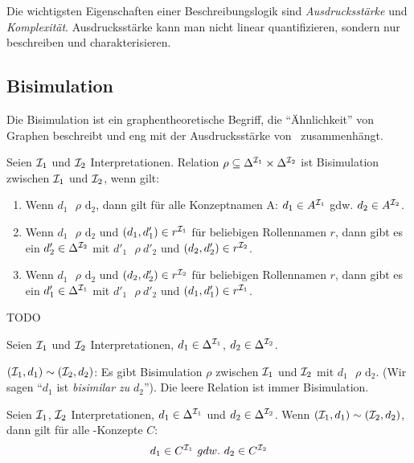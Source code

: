 Die wichtigsten Eigenschaften einer Beschreibungslogik sind
\emph{Ausdrucksstärke} und \emph{Komplexität}. Ausdrucksstärke kann man nicht
linear quantifizieren, sondern nur beschreiben und charakterisieren.

\subsection{Bisimulation}\label{bisimulation}

Die Bisimulation ist ein graphentheoretische Begriff, die \enquote{Ähnlichkeit} von Graphen beschreibt und eng mit der Ausdrucksstärke von \ALC\ zusammenhängt.

\begin{definition}[Bisimulation]

Seien $\mathcal{I}_1$ und $\mathcal{I}_2$ Interpretationen. Relation
$\rho \subseteq \Delta^{\mathcal{I}_1} \times \Delta^{\mathcal{I}_2}$ ist Bisimulation
zwischen $\mathcal{I}_1$ und $\mathcal{I}_2$, wenn gilt:

\begin{enumerate}
\def\labelenumi{\arabic{enumi}.}
\item
  Wenn $d_1\text{\ $\rho$}\text{\ d}_2$, dann gilt für alle
  Konzeptnamen A: $d_1 \in A^{\mathcal{I}_1}$ gdw. $d_2 \in A^{\mathcal{I}_2}$.
\item
  Wenn $d_1\text{\ $\rho$}\text{\ d}_2$ und
  $\left( d_1,d_1' \right) \in r^{\MI_1}$ für beliebigen
  Rollennamen $r$, dann gibt es ein $d_2' \in \Delta^{\mathcal{I}_2}$
  mit ${d'}_1\text{\ $\rho$}{\ d'}_2$ und
  $\left( d_2,d_2' \right) \in r^{\MI_2}$.
\item
  Wenn $d_1\text{\ $\rho$}\text{\ d}_2$ und
  $\left( d_2,d_2' \right) \in r^{\MI_2}$ für beliebigen
  Rollennamen $r$, dann gibt es ein $d_1' \in \Delta^{\mathcal{I}_1}$
  mit ${d'}_1\text{\ $\rho$}{\ d'}_2$ und
  $\left( d_1,d_1' \right) \in r^{\MI_1}$.
\end{enumerate}
\end{definition}

\begin{tafel}[TODO]
    TODO
\end{tafel}

Seien $\mathcal{I}_1$ und $\mathcal{I}_2$ Interpretationen,
$d_1 \in \Delta^{\mathcal{I}_1}$, $d_2 \in \Delta^{\mathcal{I}_2}$.

$(\mathcal{I}_1,d_1) \sim (\mathcal{I}_2,d_2)$: Es gibt Bisimulation $\rho$
zwischen $\mathcal{I}_1$ und $\mathcal{I}_2$ mit $d_1\text{\ $\rho$}\text{\ d}_2$. (Wir sagen \enquote{$d_1$ ist \emph{bisimilar zu} $d_2$}).
Die leere Relation ist immer Bisimulation.

\begin{theorem}[Bisimulationstheorem]
    \label{thm:bisim}
Seien $\mathcal{I}_1$, $\mathcal{I}_2$ Interpretationen,
$d_1 \in \Delta^{\mathcal{I}_1}$ und $d_2 \in \Delta^{\mathcal{I}_2}$. Wenn
$(\mathcal{I}_1,d_1) \sim (\mathcal{I}_2,d_2)$, dann gilt für alle \ALC-Konzepte
$C$:
\[d_1 \in C^{\mathcal{I}_1}\ gdw.\ d_2 \in C^{\mathcal{I}_2}\]
\end{theorem}

